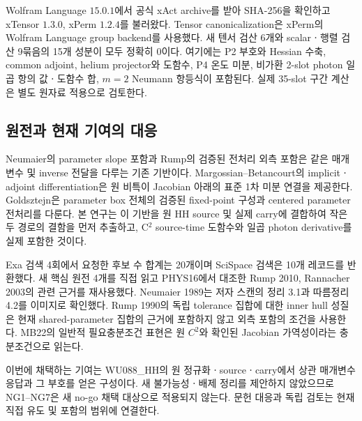 Wolfram Language $15.0.1$에서 공식 xAct archive를 받아 SHA-256을 확인하고 xTensor $1.3.0$, xPerm $1.2.4$를 불러왔다. Tensor canonicalization은 xPerm의 Wolfram Language group backend를 사용했다. 새 텐서 검산 6개와 scalarㆍ행렬 검산 9묶음의 15개 성분이 모두 정확히 0이다. 여기에는 P2 부호와 Hessian 수축, common adjoint, helium projector와 도함수, P4 온도 미분, 비가환 2-slot photon 일곱 항의 값ㆍ도함수 합, $m=2$ Neumann 항등식이 포함된다. 실제 35-slot 구간 계산은 별도 원자료 적용으로 검토한다.\cite{xact17}



\subsection{원전과 현재 기여의 대응}
Neumaier의 parameter slope 포함과 Rump의 검증된 전처리 외측 포함은 같은 매개변수 및 inverse 전달을 다루는 기존 기반이다. Margossian--Betancourt의 implicitㆍadjoint differentiation은 원 비특이 Jacobian 아래의 표준 1차 미분 연결을 제공한다. Goldsztejn은 parameter box 전체의 검증된 fixed-point 구성과 centered parameter 전처리를 다룬다. 본 연구는 이 기반을 원 HH source 및 실제 carry에 결합하여 작은 두 경로의 결함을 먼저 추출하고, C$^2$ source-time 도함수와 일곱 photon derivative를 실제 포함한 것이다.\cite{Neumaier1989Sensitivity,Rump1990Sensitivity,Goldsztejn2008Sensitivity,MargossianBetancourt2022Implicit}

Exa 검색 4회에서 요청한 후보 수 합계는 20개이며 SciSpace 검색은 10개 레코드를 반환했다. 새 핵심 원전 4개를 직접 읽고 PHYS16에서 대조한 Rump 2010, Rannacher 2003의 관련 근거를 재사용했다. Neumaier 1989는 저자 스캔의 정리 3.1과 따름정리 4.2를 이미지로 확인했다. Rump 1990의 독립 tolerance 집합에 대한 inner hull 성질은 현재 shared-parameter 집합의 근거에 포함하지 않고 외측 포함의 조건을 사용한다. MB22의 일반적 필요충분조건 표현은 원 $C^2$와 확인된 Jacobian 가역성이라는 충분조건으로 읽는다.\cite{Neumaier1989Sensitivity,Rump1990Sensitivity,MargossianBetancourt2022Implicit,Rump2010Verification,Rannacher2003Adaptive}

이번에 채택하는 기여는 WU088\_HH의 원 정규화ㆍsourceㆍcarry에서 상관 매개변수 응답과 그 부호를 얻은 구성이다. 새 불가능성ㆍ배제 정리를 제안하지 않았으므로 NG1--NG7은 새 no-go 채택 대상으로 적용되지 않는다. 문헌 대응과 독립 검토는 현재 직접 유도 및 포함의 범위에 연결한다.
